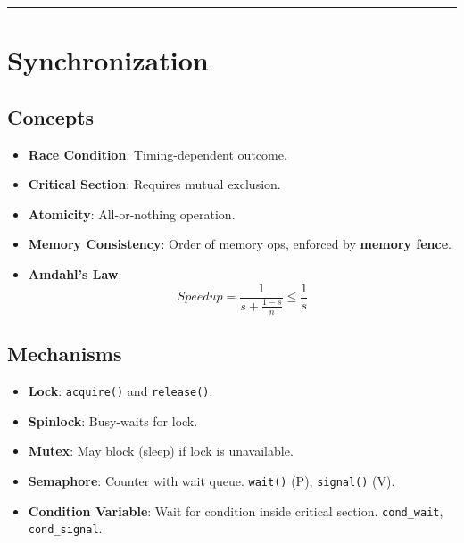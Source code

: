 \documentclass[8pt,a4paper]{article}
\newcommand{\sectiondivider}{\vspace{4pt}\hrule\vspace{4pt}}
\begin{document}
\begin{multicols}{2}
\sectiondivider
\section*{Synchronization}
\subsection*{Concepts}
\begin{itemize}
    \item \textbf{Race Condition}: Timing-dependent outcome.
    \item \textbf{Critical Section}: Requires mutual exclusion.
    \item \textbf{Atomicity}: All-or-nothing operation.
    \item \textbf{Memory Consistency}: Order of memory ops, enforced by \textbf{memory fence}.
    \item \textbf{Amdahl's Law}:
    $$ Speedup = \frac{1}{s + \frac{1-s}{n}} \le \frac{1}{s} $$
\end{itemize}

\subsection*{Mechanisms}
\begin{itemize}
    \item \textbf{Lock}: \texttt{acquire()} and \texttt{release()}.
    \item \textbf{Spinlock}: Busy-waits for lock.
    \item \textbf{Mutex}: May block (sleep) if lock is unavailable.
    \item \textbf{Semaphore}: Counter with wait queue. \texttt{wait()} (P), \texttt{signal()} (V).
    \item \textbf{Condition Variable}: Wait for condition inside critical section. \texttt{cond\_wait}, \texttt{cond\_signal}.
\end{itemize}


\end{multicols}
\end{document}
